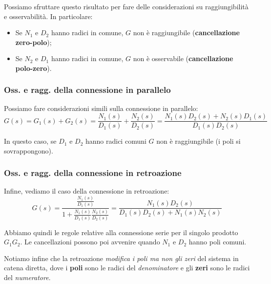\documentclass[a4paper,11pt]{article}
\begin{document}
Possiamo sfruttare questo risultato per fare delle considerazioni su raggiungibilità e osservabilità. In particolare:
\begin{itemize}
	\item Se $N_1$ e $D_2$ hanno radici in comune, $G$ non è raggiungibile (\textbf{cancellazione zero-polo});
	\item Se $N_2$ e $D_1$ hanno radici in comune, $G$ non è osservabile (\textbf{cancellazione polo-zero}).
\end{itemize}

\subsubsection{Oss. e ragg. della connessione in parallelo}
Possiamo fare considerazioni simili sulla connessione in parallelo:
$$
G(s) = G_1(s) + G_2(s) = \frac{N_1(s)}{D_1(s)} + \frac{N_2(s)}{D_2(s)} = \frac{N_1(s)D_2(s) + N_2(s)D_1(s)}{D_1(s)D_2(s)}
$$

In questo caso, se $D_1$ e $D_2$ hanno radici comuni $G$ non è raggiungibile (i poli si sovrappongono). 

\subsubsection{Oss. e ragg. della connessione in retroazione}
Infine, vediamo il caso della connessione in retroazione:
$$
G(s) = \frac{\frac{N_1(s)}{D_1(s)}}{1 + \frac{N_1(s)}{D_1(s)} \frac{N_2(s)}{D_2(s)}} = \frac{N_1(s)D_2(s)}{D_1(s)D_2(s) + N_1(s)N_2(s)}
$$

Abbiamo quindi le regole relative alla connessione serie per il singolo prodotto $G_1 G_2$.
Le cancellazioni possono poi avvenire quando $N_1$ e $D_2$ hanno poli comuni.

Notiamo infine che la retroazione \textit{modifica i poli ma non gli zeri} del sistema in catena diretta, dove i \textbf{poli} sono le radici del \textit{denominatore} e gli \textbf{zeri} sono le radici del \textit{numeratore}.
\end{document}
